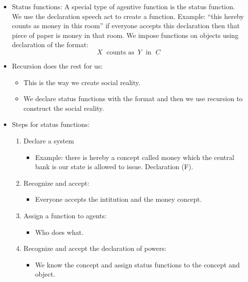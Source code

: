 \begin{itemize}
    \item Status functions: A special type of agentive function is the status function. We use the declaration speech act to create a function. Example: ``this hereby counts as money in this room'' if everyone accepts this declaration then that piece of paper is money in that room. 
     \newline  We impose functions on objects using declaration of the format:
        \[
          X \; \text{ counts as }\, Y \; \text{ in } \; C
        \]
        
    \item Recursion does the rest for us: 
        \begin{itemize}
            \item This is the way we create social reality.
            \item We declare status functions with the format and then we use recursion to construct the social reality.
        \end{itemize}
    
    \item Steps for status functions:
        \begin{enumerate}
            \item Declare a system 
                \begin{itemize}
                    \item Example: there is hereby a concept called money which the central bank is our state is allowed to issue. Declaration (F).
                \end{itemize}
            \item Recognize and accept: 
                \begin{itemize}
                    \item Everyone accepts the intitution and the money concept.
                \end{itemize}
            
            \item Assign a function to agents: 
                \begin{itemize}
                    \item Who does what.
                \end{itemize}
            
            \item Recognize and accept the declaration of powers: 
                \begin{itemize}
                    \item We know the concept and assign status functions to the concept and object.
                \end{itemize}
            

\end{enumerate}
\end{itemize}
